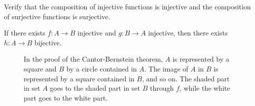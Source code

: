 \begin{exercise}
    Verify that the composition of injective functions is injective and the
  composition of surjective functions is surjective.
\end{exercise}

\begin{theorem}%
  \label{th:cantor_bernstein}%
    If there exists $f\colon A \to B$ injective and $g\colon B\to A$ injective,
  then there exists $h \colon A \to B$ bijective.
\end{theorem}
%
\begin{figure}
  \centering
{}

\caption{
    In the proof of the Cantor-Bernstein theorem, $A$ is represented by a square
  and $B$ by a circle contained in $A$. The image of $A$ in $B$ is represented
  by a square contained in $B$, and so on. The shaded part in set $A$ goes to
  the shaded part in set $B$ through $f$, while the white part goes to the white
  part.
  }
  \label{fig:omotetia}
\end{figure}
%
